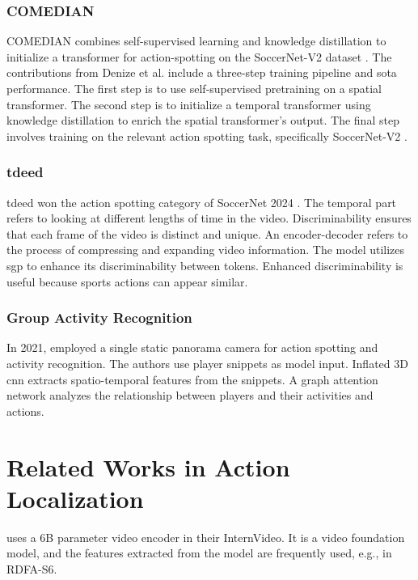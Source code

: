 \subsubsection{COMEDIAN}
COMEDIAN \cite{denize_comedian_2024} combines self-supervised learning and knowledge distillation to initialize a transformer for action-spotting on the SoccerNet-V2 dataset \cite{deliege_soccernet-v2_dataset_2021}. The contributions from Denize et al. include a three-step training pipeline and \acrlong{sota} performance. The first step is to use self-supervised pretraining on a spatial transformer. The second step is to initialize a temporal transformer using knowledge distillation to enrich the spatial transformer's output. The final step involves training on the relevant action spotting task, specifically SoccerNet-V2 \cite{deliege_soccernet-v2_dataset_2021}.

\subsubsection{\acrfull{tdeed}}
\acrlong{tdeed} \cite{xarles_t-deed_2024} won the action spotting category of SoccerNet 2024 \cite{cioppa_soccernet_2024}. The temporal part refers to looking at different lengths of time in the video. Discriminability ensures that each frame of the video is distinct and unique. An encoder-decoder refers to the process of compressing and expanding video information. The model utilizes \acrfull{sgp} to enhance its discriminability between tokens. Enhanced discriminability is useful because sports actions can appear similar. 

\subsubsection{Group Activity Recognition}

In 2021, \textcite{gerats_individual_same_task_2021} employed a single static panorama camera for action spotting and activity recognition. The authors use player snippets as model input. Inflated 3D \acrshort{cnn} extracts spatio-temporal features from the snippets. A graph attention network analyzes the relationship between players and their activities and actions.

\section{Related Works in Action Localization}
\label{sec:related_works_all}

\textcite{wang_internvideo2_2024} uses a 6B parameter video encoder in their InternVideo. It is a video foundation model, and the features extracted from the model are frequently used, e.g., in RDFA-S6.

